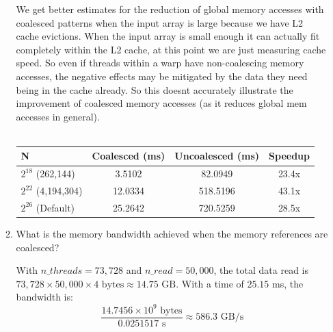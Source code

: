 \documentclass{article}
\newenvironment{answer}
{\par\color{blue}}
{\normalfont\par}
\begin{document}
\begin{enumerate}
\begin{enumerate}
                    \begin{answer}
                        We get better estimates for the reduction of global memory accesses with coalesced patterns
                        when the input array is large because we have L2 cache evictions. When the input array is small enough
                        it can actually fit completely within the L2 cache, at this point we are just measuring cache speed.
                        So even if threads within a warp have non-coalescing memory accesses, the negative effects may be mitigated
                        by the data they need being in the cache already. So this doesnt accurately illustrate the improvement of
                        coalesced memory accesses (as it reduces global mem accesses in general).
                        \\ \\
                        \begin{center}
                            \begin{tabular}{|l|c|c|c|}
                                \hline
                                N                    & Coalesced (ms) & Uncoalesced (ms) & Speedup \\
                                \hline
                                $2^{18}$ (262,144)   & 3.5102         & 82.0949          & 23.4x   \\
                                $2^{22}$ (4,194,304) & 12.0334        & 518.5196         & 43.1x   \\
                                $2^{26}$ (Default)   & 25.2642        & 720.5259         & 28.5x   \\
                                \hline
                            \end{tabular}
                        \end{center}
                    \end{answer}

              \item What is the memory bandwidth achieved when the memory references are
                    coalesced?

                    \begin{answer}
                        With $n\_threads = 73,728$ and $n\_read = 50,000$, the total data read is $73,728 \times 50,000 \times 4 \textrm{ bytes} \approx 14.75 \textrm{ GB}$.
                        With a time of $25.15$ ms, the bandwidth is:
                        $$ \frac{14.7456 \times 10^9 \textrm{ bytes}}{0.0251517 \textrm{ s}} \approx 586.3 \textrm{ GB/s} $$
                    \end{answer}


\end{enumerate}
\end{enumerate}
\end{document}
